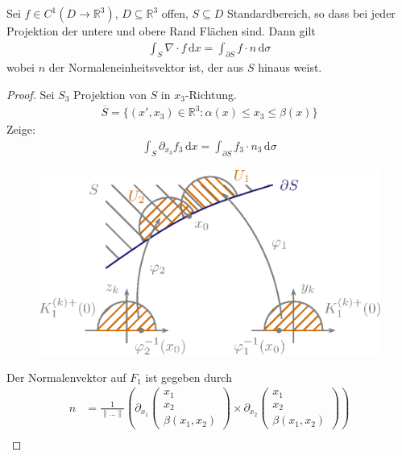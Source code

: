 \documentclass[a4paper,10pt]{scrbook}
\begin{document}
\begin{theorem}
  Sei $f \in C^1(D \to \mathbb{R}^3)$, $D \subseteq \mathbb{R}^3$ offen, $S \subseteq D$ Standardbereich, so dass bei jeder Projektion der untere und obere Rand Flächen sind. Dann gilt
  \begin{align*}
    \int_S \nabla \cdot f \, \mathrm{d}x = \int_{\partial S} f \cdot n \, \mathrm{d}\sigma
  \end{align*}
  wobei $n$ der Normaleneinheitsvektor ist, der aus $S$ hinaus weist.

  \begin{proof}
    Sei $S_3$ Projektion von $S$ in $x_3$-Richtung.
    \begin{align*}
      \overline{S} = \{ (x', x_3) \in \mathbb{R}^3 : \alpha(x) \leq x_3 \leq \beta(x) \}
    \end{align*}
    Zeige:
    \begin{align*}
      \int_S \partial_{x_3} f_3 \, \mathrm{d}x = \int_{\partial S} f_3 \cdot n_3 \, \mathrm{d}\sigma
    \end{align*}
    \begin{figure}[H]
      \centering
      \includegraphics[scale=0.2]{images/ana3-tmp-70}
    \end{figure}
    Der Normalenvektor auf $F_1$ ist gegeben durch
    \begin{align*}
      n
      &= \frac{1}{\|\ldots\|} \left( \partial_{x_1} \begin{pmatrix} x_1 \\ x_2 \\ \beta(x_1,x_2) \end{pmatrix} \times \partial_{x_2} \begin{pmatrix} x_1 \\ x_2 \\ \beta(x_1,x_2) \end{pmatrix} \right) \\

\end{align*}
\end{proof}
\end{theorem}
\end{document}
